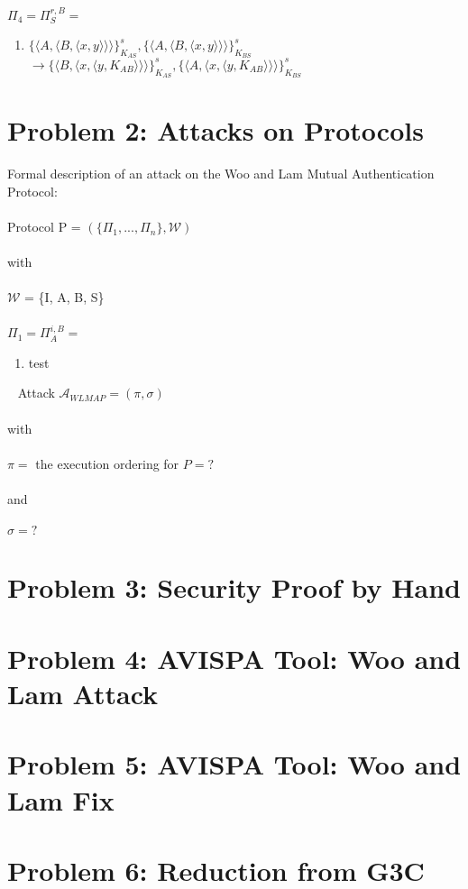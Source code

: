 \documentclass[12pt,pdftex,a4paper]{article}
\newcommand\tab[1][1cm]{\hspace*{#1}}
\begin{document}
$\Pi_4 = \Pi_S^{r,B} =$
\begin{enumerate}
\item \tab $ \{\langle A, \langle B, \langle x, y\rangle\rangle\rangle\}_{K_{AS}}^s, \{\langle A, \langle B, \langle x, y\rangle\rangle\rangle\}_{K_{BS}}^s $ \\ \tab $\rightarrow \{\langle B, \langle x, \langle y, K_{AB}\rangle\rangle\rangle\}_{K_{AS}}^s,\{\langle A, \langle x, \langle y, K_{AB}\rangle\rangle\rangle\}_{K_{BS}}^s $
\end{enumerate}

\newpage
\section*{Problem 2: Attacks on Protocols}
Formal description of an attack on the Woo and Lam Mutual Authentication Protocol:\\~\\
Protocol P = $(\{\Pi_1, ..., \Pi_n\}, \mathcal{W})$ \\~\\
with\\~\\
$\mathcal{W}$ = \{I, A, B, S\}\\~\\
$\Pi_1 = \Pi_A^{i,B} =$
\begin{enumerate}
\item \tab test %
\end{enumerate}\
\newline
Attack $\mathcal{A}_{WLMAP} = (\pi, \sigma) $ \\~\\
with\\~\\
$\pi = $ the execution ordering for $ P = ? $ \\~\\
and \\~\\
$\sigma =? $


\section*{Problem 3: Security Proof by Hand}

\section*{Problem 4: AVISPA Tool: Woo and Lam Attack}

\section*{Problem 5: AVISPA Tool: Woo and Lam Fix}

\section*{Problem 6: Reduction from G3C}
\end{document}
